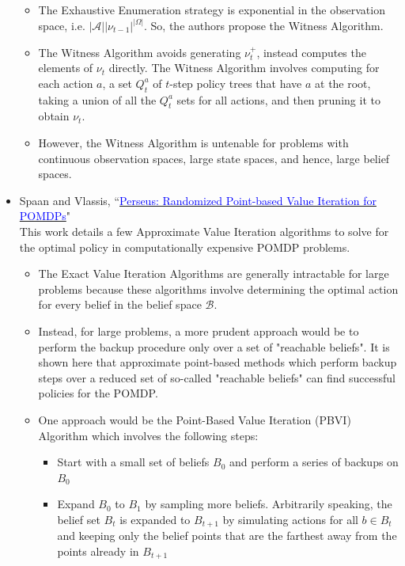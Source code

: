 \documentclass[12pt, draftcls, onecolumn]{IEEEtran}
\begin{document}
\begin{itemize}
\begin{itemize}
        \item The Exhaustive Enumeration strategy is exponential in the observation space, i.e. $|\mathcal{A}||\nu_{t-1}|^{|\Omega|}$. So, the authors propose the Witness Algorithm.
        \item The Witness Algorithm avoids generating $\nu_t^+$, instead computes the elements of $\nu_t$ directly. The Witness Algorithm involves computing for each action $a$, a set $Q_t^a$ of $t$-step policy trees that have $a$ at the root, taking a union of all the $Q_t^a$ sets for all actions, and then pruning it to obtain $\nu_t$.
        \item However, the Witness Algorithm is untenable for problems with continuous observation spaces, large state spaces, and hence, large belief spaces.
    \end{itemize}
    \item Spaan and Vlassis, ``\href{https://people.csail.mit.edu/lpk/papers/aij98-pomdp.pdf}{\textcolor{blue}{Perseus: Randomized Point-based Value Iteration for POMDPs}}"
    \\This work details a few Approximate Value Iteration algorithms to solve for the optimal policy in computationally expensive POMDP problems.
    \begin{itemize}
        \item The Exact Value Iteration Algorithms are generally intractable for large problems because these algorithms involve determining the optimal action for every belief in the belief space $\mathcal{B}$.
        \item Instead, for large problems, a more prudent approach would be to perform the backup procedure only over a set of "reachable beliefs". It is shown here that approximate point-based methods which perform backup steps over a reduced set of so-called "reachable beliefs" can find successful policies for the POMDP.
        \item One approach would be the Point-Based Value Iteration (PBVI) Algorithm which involves the following steps:
        \begin{itemize}
            \item Start with a small set of beliefs $B_0$ and perform a series of backups on $B_0$
            \item Expand $B_0$ to $B_1$ by sampling more beliefs. Arbitrarily speaking, the belief set $B_t$ is expanded to $B_{t+1}$ by simulating actions for all $b \in B_t$ and keeping only the belief points that are the farthest away from the points already in $B_{t+1}$

\end{itemize}
\end{itemize}
\end{itemize}
\end{document}
